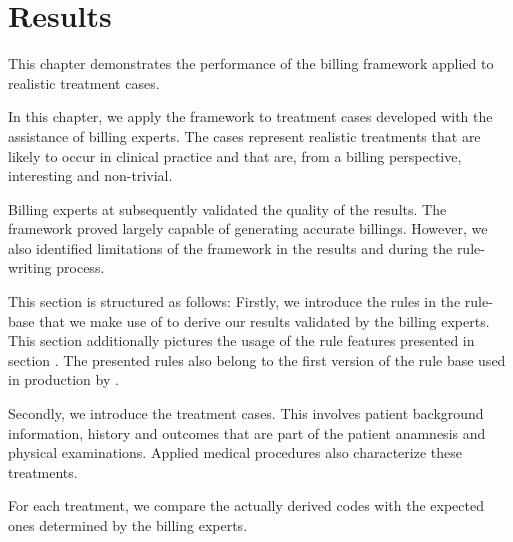 \chapter{Results}
This chapter demonstrates the performance of the billing framework applied to realistic treatment cases.


In this chapter, we apply the framework to treatment cases developed with the assistance of billing experts.
The cases represent realistic treatments that are likely to occur in clinical practice and that are, from a billing perspective, interesting and non-trivial.

Billing experts at \AV subsequently validated the quality of the results.
The framework proved largely capable of generating accurate billings.
However, we also identified limitations of the framework in the results and during the rule-writing process.

This section is structured as follows:
Firstly, we introduce the rules in the rule-base that we make use of to derive our results validated by the billing experts.
This section additionally pictures the usage of the rule features presented in section \addref.
The presented rules also belong to the first version of the rule base used in production by \AV.

Secondly, we introduce the treatment cases.
This involves patient background information, history and outcomes that are part of the patient anamnesis and physical examinations.
Applied medical procedures also characterize these treatments.

For each treatment, we compare the actually derived codes with the expected ones determined by the billing experts.
